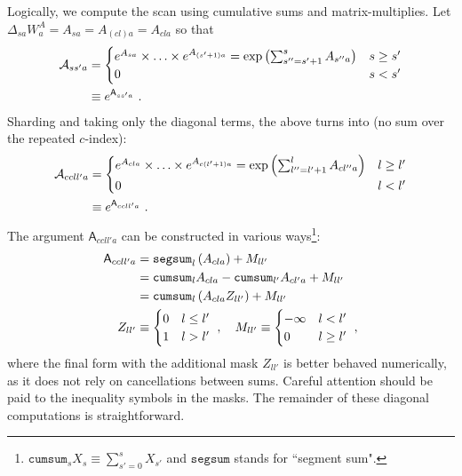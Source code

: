 \documentclass[11pt]{article}
\begin{document}
Logically, we compute the scan using cumulative sums and matrix-multiplies. Let $ \Delta_{ sa  }W_{
a  }^{ A } = A_{ sa  } = A_{ (cl)a  }=A_{ cla } $ so that
\begin{align}
    \mathcal{A}_{ ss'a } &=
    \begin{cases}
    e^{ A_{ sa }}\times \ldots \times e^{   A_{ (s'+1)a }} =\exp\left ( \sum_{ s''=s'+1 }^{ s }A_{ s''a } \right ) & s \ge s' \\
    0 &  s < s'
    \end{cases}\nonumber\\
 &\equiv e^{ \mathsf{A}_{ ss'a } }\ .
\end{align}
Sharding and taking only the diagonal terms, the above turns into (no sum over the repeated $ c
$-index):
\begin{align}
    \mathcal{A}_{ ccll'a } &=
    \begin{cases}
    e^{ A_{ cla }}\times \ldots \times e^{   A_{ c(l'+1)a }} =\exp\left ( \sum_{ l''=l'+1 }^{ l }A_{ cl''a } \right ) & l \ge l' \\
    0 &  l < l'
    \end{cases}\nonumber\\
 &\equiv e^{ \mathsf{A}_{ ccll'a } }\ .
\end{align}
The argument $ \mathsf{A}_{ ccll'a } $ can be constructed in various ways\footnote{$
\texttt{cumsum}_{ s } X_s \equiv \sum_{ s'=0 }^{ s }X_{ s' } $ and $ \texttt{segsum} $ stands for
``segment sum".}:
\begin{align}
     \mathsf{A}_{ ccll'a }&= \texttt{segsum}_{ l }\left ( A_{ cla } \right ) + M _{ ll' }\nonumber\\
     &= \texttt{cumsum}_{ l }A_{ cla } - \texttt{cumsum}_{ l' }A_{ cl'a } + M_{ ll' } \nonumber\\
      &= \texttt{cumsum}_{ l }\left ( A_{ cla }Z_{ ll' } \right ) + M _{ ll' }\nonumber\\
       Z_{ ll' } &\equiv  \begin{cases}
           0 & l \le l'\\
           1 & l > l'
       \end{cases} \ , \quad
       M_{ ll' } \equiv  \begin{cases}
           -\infty & l < l'\\
           0 & l \ge l'
       \end{cases} \ , \label{app_eq_mamba2_diag_propagator}
\end{align}
where the final form with the additional mask $ Z_{ ll' } $ is better behaved numerically, as it
does not rely on cancellations between sums. Careful attention should be paid to the inequality
symbols in the masks.  The remainder of these diagonal computations is straightforward.
\end{document}
